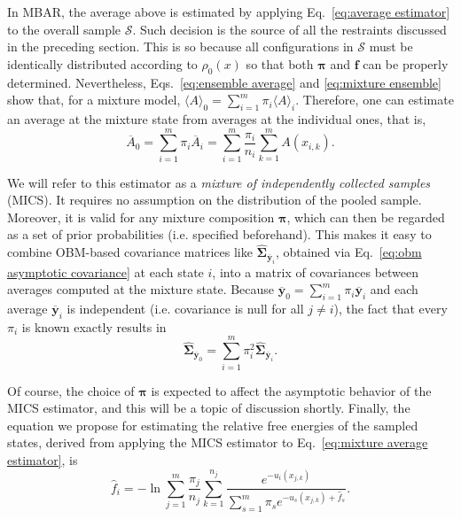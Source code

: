 \documentclass[aip,jcp,reprint,amsmath,amssymb]{revtex4-1}
\newcommand{\mt}[1]{\boldsymbol{\mathbf{#1}}}           %
\newcommand{\vt}[1]{\boldsymbol{\mathbf{#1}}}           %
\begin{document}
In MBAR, the average above is estimated by applying Eq.~\eqref{eq:average estimator} to the overall sample $\mathcal S$. Such decision is the source of all the restraints discussed in the preceding section. This is so because all configurations in $\mathcal S$ must be identically distributed according to $\rho_0(x)$ so that both $\vt \pi$ and $\vt f$ can be properly determined. Nevertheless, Eqs.~\eqref{eq:ensemble average} and \eqref{eq:mixture ensemble} show that, for a mixture model, $\langle A \rangle_0 = \sum_{i=1}^m \pi_i \langle A \rangle_i$. Therefore, one can estimate an average at the mixture state from averages at the individual ones, that is,
\begin{equation}
\label{eq:mixture average estimator}
{\overline A}_0 = \sum_{i=1}^m \pi_i \overline{A}_i = \sum_{i=1}^m \frac{\pi_i}{n_i} \sum_{k=1}^m A(x_{i,k}).
\end{equation}

We will refer to this estimator as a \textit{mixture of independently collected samples} (MICS). It requires no assumption on the distribution of the pooled sample. Moreover, it is valid for any mixture composition $\vt \pi$, which can then be regarded as a set of prior probabilities (i.e. specified beforehand). This makes it easy to combine OBM-based covariance matrices like $\hat{\mt \Sigma}_{\overline{\vt y}_i}$, obtained via Eq.~\eqref{eq:obm asymptotic covariance} at each state $i$, into a matrix of covariances between averages computed at the mixture state. Because $\overline{\vt y}_0 = \sum_{i=1}^m \pi_i \overline{\vt y}_i$ and each average $\overline{\vt y}_i$ is independent (i.e. covariance is null for all $j \neq i$), the fact that every $\pi_i$ is known exactly results in
\begin{equation}
\label{eq:mixture variance estimator}
\hat{\mt \Sigma}_{\overline{\vt y}_0} = \sum_{i=1}^m \pi_i^2 \hat{\mt \Sigma}_{\overline{\vt y}_i}.
\end{equation}

Of course, the choice of $\vt \pi$ is expected to affect the asymptotic behavior of the MICS estimator, and this will be a topic of discussion shortly. Finally, the equation we propose for estimating the relative free energies of the sampled states, derived from applying the MICS estimator to Eq.~\eqref{eq:mixture average estimator}, is
\begin{equation}
\label{eq:mblock free energy estimator}
{\hat f}_i = -\ln \sum_{j=1}^m \frac{\pi_j}{n_j} \sum_{k=1}^{n_j} \frac{e^{-u_i(x_{j,k})}}{\sum_{s=1}^m \pi_s e^{-u_s(x_{j,k}) + {\hat f}_s}}.
\end{equation}
\end{document}
